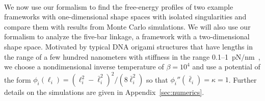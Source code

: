 \phantom{}\\
We now use our formalism to find the free-energy profiles of two example frameworks with one-dimensional shape spaces with isolated singularities and compare them with results from Monte Carlo simulations.
We will also use our formalism to analyze the five-bar linkage, a framework with a two-dimensional shape space.
Motivated by typical DNA origami structures that have lengths in the range of a few hundred nanometers with stiffness in the range 0.1--1~pN$/$nm~\cite{jung2020}, we choose a nondimensional inverse temperature of $\beta = 10^{4}$ and use a potential of the form $\phi_{i}(\ell_{i}) = (\ell_{i}^{2} - \bar{\ell}_{i}^{2})^{2}/(8\bar{\ell}_{i}^{2})$ so that $\phi_{i}''(\bar{\ell}_{i}) = \kappa = 1$.
Further details on the simulations are given in Appendix~\ref{sec:numerics}.


